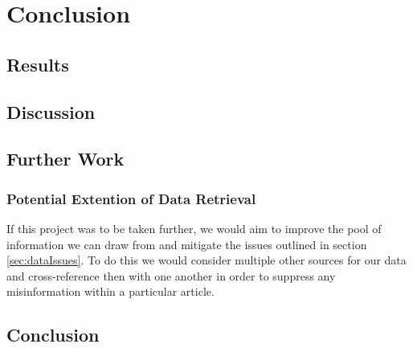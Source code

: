 \documentclass[bsc,frontabs,twoside,singlespacing,parskip,deptreport]{infthesis}     %
\begin{document}

\chapter{Conclusion}
\section{Results}
\section{Discussion}
\section{Further Work}
\subsection{Potential Extention of Data Retrieval}
If this project was to be taken further, we would aim to improve the pool of information we can draw from and mitigate the issues outlined in section \ref{sec:dataIssues}.
To do this we would consider multiple other sources for our data and cross-reference then with one another in order to suppress any misinformation within
a particular article.


\section{Conclusion}


\end{document}
